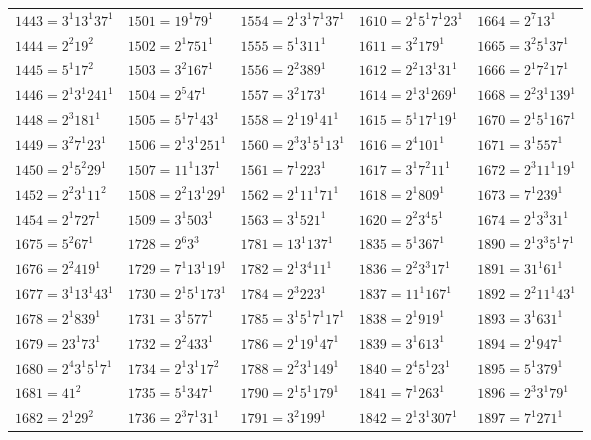 {\begin{longtable}[c]{*{5}{l}}
$1443=3^{1}13^{1}37^{1}$&$1501=19^{1}79^{1}$&$1554=2^{1}3^{1}7^{1}37^{1}$&$1610=2^{1}5^{1}7^{1}23^{1}$&$1664=2^{7}13^{1}$\\
$1444=2^{2}19^{2}$&$1502=2^{1}751^{1}$&$1555=5^{1}311^{1}$&$1611=3^{2}179^{1}$&$1665=3^{2}5^{1}37^{1}$\\
$1445=5^{1}17^{2}$&$1503=3^{2}167^{1}$&$1556=2^{2}389^{1}$&$1612=2^{2}13^{1}31^{1}$&$1666=2^{1}7^{2}17^{1}$\\
$1446=2^{1}3^{1}241^{1}$&$1504=2^{5}47^{1}$&$1557=3^{2}173^{1}$&$1614=2^{1}3^{1}269^{1}$&$1668=2^{2}3^{1}139^{1}$\\
$1448=2^{3}181^{1}$&$1505=5^{1}7^{1}43^{1}$&$1558=2^{1}19^{1}41^{1}$&$1615=5^{1}17^{1}19^{1}$&$1670=2^{1}5^{1}167^{1}$\\
$1449=3^{2}7^{1}23^{1}$&$1506=2^{1}3^{1}251^{1}$&$1560=2^{3}3^{1}5^{1}13^{1}$&$1616=2^{4}101^{1}$&$1671=3^{1}557^{1}$\\
$1450=2^{1}5^{2}29^{1}$&$1507=11^{1}137^{1}$&$1561=7^{1}223^{1}$&$1617=3^{1}7^{2}11^{1}$&$1672=2^{3}11^{1}19^{1}$\\
$1452=2^{2}3^{1}11^{2}$&$1508=2^{2}13^{1}29^{1}$&$1562=2^{1}11^{1}71^{1}$&$1618=2^{1}809^{1}$&$1673=7^{1}239^{1}$\\
$1454=2^{1}727^{1}$&$1509=3^{1}503^{1}$&$1563=3^{1}521^{1}$&$1620=2^{2}3^{4}5^{1}$&$1674=2^{1}3^{3}31^{1}$\\
\pagebreak
$1675=5^{2}67^{1}$&$1728=2^{6}3^{3}$&$1781=13^{1}137^{1}$&$1835=5^{1}367^{1}$&$1890=2^{1}3^{3}5^{1}7^{1}$\\
$1676=2^{2}419^{1}$&$1729=7^{1}13^{1}19^{1}$&$1782=2^{1}3^{4}11^{1}$&$1836=2^{2}3^{3}17^{1}$&$1891=31^{1}61^{1}$\\
$1677=3^{1}13^{1}43^{1}$&$1730=2^{1}5^{1}173^{1}$&$1784=2^{3}223^{1}$&$1837=11^{1}167^{1}$&$1892=2^{2}11^{1}43^{1}$\\
$1678=2^{1}839^{1}$&$1731=3^{1}577^{1}$&$1785=3^{1}5^{1}7^{1}17^{1}$&$1838=2^{1}919^{1}$&$1893=3^{1}631^{1}$\\
$1679=23^{1}73^{1}$&$1732=2^{2}433^{1}$&$1786=2^{1}19^{1}47^{1}$&$1839=3^{1}613^{1}$&$1894=2^{1}947^{1}$\\
$1680=2^{4}3^{1}5^{1}7^{1}$&$1734=2^{1}3^{1}17^{2}$&$1788=2^{2}3^{1}149^{1}$&$1840=2^{4}5^{1}23^{1}$&$1895=5^{1}379^{1}$\\
$1681=41^{2}$&$1735=5^{1}347^{1}$&$1790=2^{1}5^{1}179^{1}$&$1841=7^{1}263^{1}$&$1896=2^{3}3^{1}79^{1}$\\
$1682=2^{1}29^{2}$&$1736=2^{3}7^{1}31^{1}$&$1791=3^{2}199^{1}$&$1842=2^{1}3^{1}307^{1}$&$1897=7^{1}271^{1}$\\

\end{longtable}}
